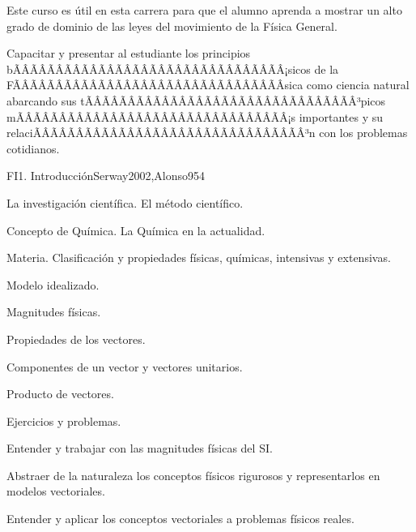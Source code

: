 \begin{sumilla}


\begin{fundamentacion}
Este curso es \'util en esta carrera para que el alumno aprenda a mostrar un alto grado de dominio de las leyes del movimiento de la F\'isica General.
\end{fundamentacion}

\begin{objetivosdelcurso}
\item Capacitar y presentar al estudiante los principios bÃÂÃÂÃÂÃÂÃÂÃÂÃÂÃÂÃÂÃÂÃÂÃÂÃÂÃÂÃÂÃÂ¡sicos de la FÃÂÃÂÃÂÃÂÃÂÃÂÃÂÃÂÃÂÃÂÃÂÃÂÃÂÃÂÃÂÃÂ­sica como ciencia natural abarcando sus tÃÂÃÂÃÂÃÂÃÂÃÂÃÂÃÂÃÂÃÂÃÂÃÂÃÂÃÂÃÂÃÂ³picos mÃÂÃÂÃÂÃÂÃÂÃÂÃÂÃÂÃÂÃÂÃÂÃÂÃÂÃÂÃÂÃÂ¡s importantes y su relaciÃÂÃÂÃÂÃÂÃÂÃÂÃÂÃÂÃÂÃÂÃÂÃÂÃÂÃÂÃÂÃÂ³n con los problemas cotidianos.
\end{objetivosdelcurso}

\begin{outcomes}
\end{outcomes}

\begin{unit}{FI1. Introducci\'on}{Serway2002,Alonso95}{4}
\begin{topicos}
      \item La investigaci\'on cient\'ifica. El m\'etodo cient\'ifico.
      \item Concepto de Qu\'imica. La Qu\'imica en la actualidad.
      \item Materia. Clasificaci\'on y propiedades f\'isicas, qu\'imicas, intensivas y extensivas.
      \item Modelo idealizado.
      \item Magnitudes f\'isicas.
      \item Propiedades de los vectores.
      \item Componentes de un vector y vectores unitarios.
      \item Producto de vectores.
      \item Ejercicios y problemas.
   \end{topicos}

   \begin{objetivos}
      \item Entender y trabajar con las magnitudes f\'isicas del SI.
      \item Abstraer de la naturaleza los conceptos f\'isicos rigurosos y
      representarlos en modelos vectoriales.
      \item Entender y aplicar los conceptos vectoriales a problemas f\'isicos reales.
   \end{objetivos}
\end{unit}


\end{sumilla}
